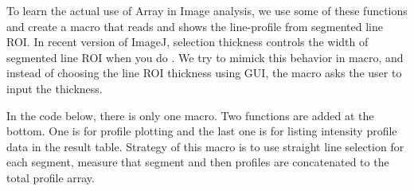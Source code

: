 To learn the actual use of Array in Image analysis, we use some of these functions and 
create a macro that reads and shows the line-profile from segmented line ROI. 
In recent version of ImageJ, selection thickness controls the width of segmented
line ROI when you do . We try to mimick this
behavior in macro, and instead of choosing the line ROI thickness using GUI, the
macro asks the user to input the thickness. 

In the code below, there is only one macro. Two functions are added at the
bottom. One is for profile plotting and the last one is for listing
intensity profile data in the result table. Strategy of this macro is to use
straight line selection for each segment, measure that segment and then profiles
are concatenated to the total profile array.

%
%


